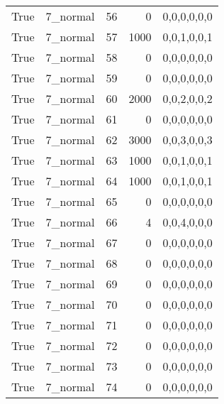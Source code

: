 \begin{tabular}{llrrl}
 True            & 7\_normal            &            56 &                     0 & 0,0,0,0,0,0   \\
 True            & 7\_normal            &            57 &                  1000 & 0,0,1,0,0,1   \\
 True            & 7\_normal            &            58 &                     0 & 0,0,0,0,0,0   \\
 True            & 7\_normal            &            59 &                     0 & 0,0,0,0,0,0   \\
 True            & 7\_normal            &            60 &                  2000 & 0,0,2,0,0,2   \\
 True            & 7\_normal            &            61 &                     0 & 0,0,0,0,0,0   \\
 True            & 7\_normal            &            62 &                  3000 & 0,0,3,0,0,3   \\
 True            & 7\_normal            &            63 &                  1000 & 0,0,1,0,0,1   \\
 True            & 7\_normal            &            64 &                  1000 & 0,0,1,0,0,1   \\
 True            & 7\_normal            &            65 &                     0 & 0,0,0,0,0,0   \\
 True            & 7\_normal            &            66 &                     4 & 0,0,4,0,0,0   \\
 True            & 7\_normal            &            67 &                     0 & 0,0,0,0,0,0   \\
 True            & 7\_normal            &            68 &                     0 & 0,0,0,0,0,0   \\
 True            & 7\_normal            &            69 &                     0 & 0,0,0,0,0,0   \\
 True            & 7\_normal            &            70 &                     0 & 0,0,0,0,0,0   \\
 True            & 7\_normal            &            71 &                     0 & 0,0,0,0,0,0   \\
 True            & 7\_normal            &            72 &                     0 & 0,0,0,0,0,0   \\
 True            & 7\_normal            &            73 &                     0 & 0,0,0,0,0,0   \\
 True            & 7\_normal            &            74 &                     0 & 0,0,0,0,0,0   \\

\end{tabular}
